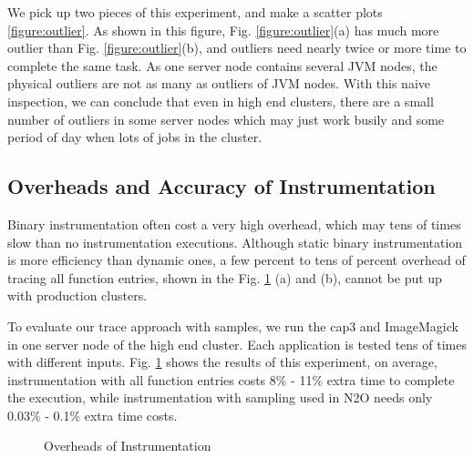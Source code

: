 We pick up two pieces of this experiment, and make a scatter plots \ref{figure:outlier}. As shown in this figure, Fig.  \ref{figure:outlier}(a) has much more outlier than Fig.  \ref{figure:outlier}(b), and outliers need nearly twice or more time to complete the same task. As one server node contains several JVM nodes, the physical outliers are not as many as outliers of JVM nodes. With this naive inspection, we can conclude that even in high end clusters, there are a small number of outliers in some server nodes which may just work busily and some period of day when lots of jobs in the cluster.

\subsection{Overheads and Accuracy of Instrumentation}

Binary instrumentation often cost a very high overhead, which may tens of times slow than no instrumentation executions. Although static binary instrumentation is more efficiency than dynamic ones, a few percent to tens of percent overhead of tracing all function entries, shown in the Fig. \ref{figure:overheads} (a) and (b), cannot be put up with production clusters.

To evaluate our trace approach with samples, we run the cap3 and ImageMagick in one server node of the high end cluster. Each application is tested tens of times with different inputs. Fig.  \ref{figure:overheads} shows the results of this experiment, on average, instrumentation with all function entries costs 8\% - 11\% extra time to complete the execution, while instrumentation with sampling used in N2O needs only 0.03\% - 0.1\% extra time costs.

\begin{figure}
\centering
{}
\caption{Overheads of Instrumentation}
\label{figure:overheads}
\end{figure}

